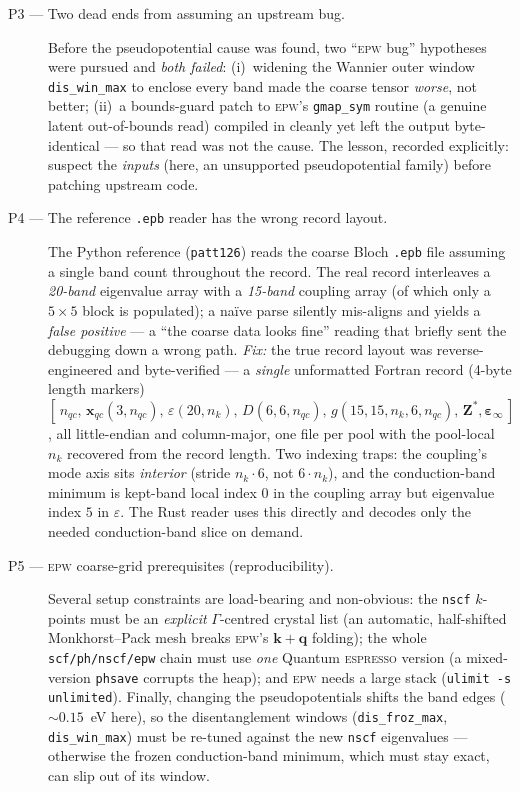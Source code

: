 \documentclass[11pt]{article}
\newcommand{\kv}{\mathbf{k}}
\newcommand{\qv}{\mathbf{q}}
\newcommand{\Zst}{\mathbf{Z}^{*}}
\newcommand{\epsinf}{\bm{\varepsilon}_{\infty}}
\begin{document}
\begin{description}
  \item[P3 --- Two dead ends from assuming an upstream bug.]
    Before the pseudopotential cause was found, two ``\textsc{epw} bug'' hypotheses were
    pursued and \emph{both failed}: (i)~widening the Wannier outer window
    \texttt{dis\_win\_max} to enclose every band made the coarse tensor \emph{worse}, not
    better; (ii)~a bounds-guard patch to \textsc{epw}'s \texttt{gmap\_sym} routine (a genuine
    latent out-of-bounds read) compiled in cleanly yet left the output byte-identical --- so
    that read was not the cause. The lesson, recorded explicitly: suspect the \emph{inputs}
    (here, an unsupported pseudopotential family) before patching upstream code.

  \item[P4 --- The reference \texttt{.epb} reader has the wrong record layout.]
    The Python reference (\texttt{patt126}) reads the coarse Bloch \texttt{.epb} file
    assuming a single band count throughout the record. The real record interleaves a
    \emph{20-band} eigenvalue array with a \emph{15-band} coupling array (of which only a
    $5\times5$ block is populated); a na\"ive parse silently mis-aligns and yields a
    \emph{false positive} --- a ``the coarse data looks fine'' reading that briefly sent the
    debugging down a wrong path.
    \emph{Fix:} the true record layout was reverse-engineered and byte-verified --- a
    \emph{single} unformatted Fortran record (4-byte length markers)
    $[\,n_{qc},\,\mathbf{x}_{qc}(3,n_{qc}),\,\varepsilon(20,n_{k}),\,D(6,6,n_{qc}),\,
    g(15,15,n_{k},6,n_{qc}),\,\Zst,\epsinf\,]$, all little-endian and column-major, one file
    per pool with the pool-local $n_{k}$ recovered from the record length. Two indexing
    traps: the coupling's mode axis sits \emph{interior} (stride $n_{k}\!\cdot\!6$, not
    $6\!\cdot\!n_{k}$), and the conduction-band minimum is kept-band local index $0$ in the
    coupling array but eigenvalue index $5$ in $\varepsilon$. The Rust reader uses this
    directly and decodes only the needed conduction-band slice on demand.

  \item[P5 --- \textsc{epw} coarse-grid prerequisites (reproducibility).]
    Several setup constraints are load-bearing and non-obvious: the \texttt{nscf}
    $k$-points must be an \emph{explicit} $\Gamma$-centred crystal list (an automatic,
    half-shifted Monkhorst--Pack mesh breaks \textsc{epw}'s $\kv+\qv$ folding); the whole
    \texttt{scf/ph/nscf/epw} chain must use \emph{one} Quantum \textsc{espresso} version (a
    mixed-version \texttt{phsave} corrupts the heap); and \textsc{epw} needs a large stack
    (\texttt{ulimit -s unlimited}). Finally, changing the pseudopotentials shifts the band
    edges ($\sim\!0.15$~eV here), so the disentanglement windows (\texttt{dis\_froz\_max},
    \texttt{dis\_win\_max}) must be re-tuned against the new \texttt{nscf} eigenvalues ---
    otherwise the frozen conduction-band minimum, which must stay exact, can slip out of its
    window.


\end{description}
\end{document}
